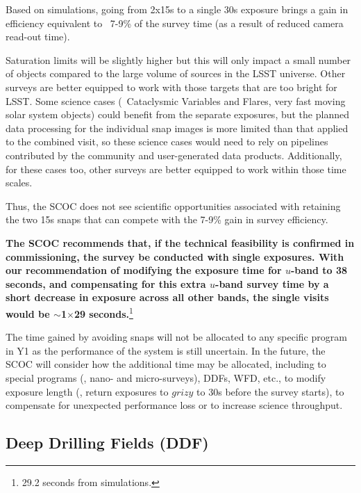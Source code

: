 Based on simulations, going from 2x15s to a single 30s exposure brings a gain in efficiency equivalent to ~7-9\% of the survey time (as a result of reduced camera read-out time). 


Saturation limits will be slightly higher but this will only impact a small number of objects compared to the large volume of sources in the LSST universe. Other surveys are better equipped to work with those targets that are too bright for LSST.
Some science cases (\eg\ Cataclysmic Variables and Flares, very fast moving solar system objects) could benefit from the separate exposures, but the planned data processing for the individual snap images is more limited than that applied to the combined visit, so these science cases would need to rely on pipelines contributed by the community and user-generated data products. Additionally, for these cases too, other surveys are better equipped to work within those time scales.

Thus, the SCOC does not see scientific opportunities associated with retaining the two 15s snaps that can compete with the 7-9\% gain in survey efficiency.

{\bf The SCOC recommends that, if the technical feasibility is confirmed in commissioning, the survey be conducted with single exposures. With our recommendation of modifying the exposure time for $u$-band to 38 seconds, and compensating for this extra $u$-band survey time by a short decrease in exposure across all other bands, the single visits would be \mbox{$\sim$1$\times$29} seconds.}\footnote{29.2 seconds from simulations.}

The time gained by avoiding snaps will not be allocated to any specific program in Y1 as the performance of the system is still uncertain. In the future, the SCOC will consider how the additional time may be allocated, including to special programs (\eg, nano- and micro-surveys), DDFs, WFD, etc., to modify exposure length (\eg, return exposures to $grizy$ to 30s before the survey starts), to compensate for unexpected performance loss or to increase science throughput.

\subsection{Deep Drilling Fields (DDF)}\label{sec:DDF}

